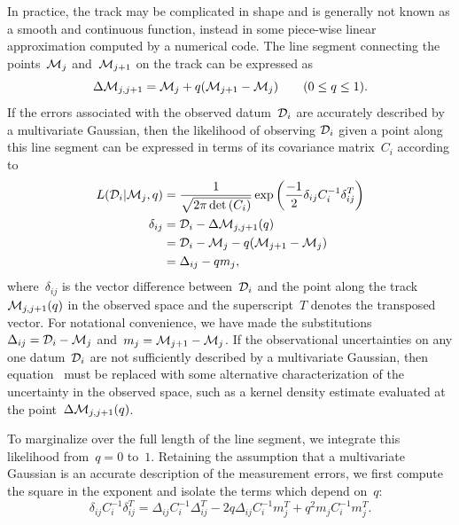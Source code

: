 \documentclass[ms.tex]{subfiles}
\begin{document}
In practice, the track may be complicated in shape and is generally not known
as a smooth and continuous function, instead in some piece-wise linear
approximation computed by a numerical code.
The line segment connecting the points~$\mathcal{M}_j$ and~$\mathcal{M}_{j + 1}$
on the track can be expressed as
\begin{equation}
\Delta\mathcal{M}_{j,j + 1} = \mathcal{M}_j + q(\mathcal{M}_{j + 1} -
\mathcal{M}_j) \qquad (0 \leq q \leq 1).
\end{equation}
If the errors associated with the observed datum~$\mathcal{D}_i$ are accurately
described by a multivariate Gaussian, then the likelihood of observing
$\mathcal{D}_i$ given a point along this line segment can be expressed in terms
of its covariance matrix~$C_i$ according to
\begin{subequations}\begin{align}
L(\mathcal{D}_i | \mathcal{M}_j, q) &=
\frac{1}{\sqrt{2\pi \det{(C_i)}}}
\exp\left(\frac{-1}{2} \delta_{ij} C_i^{-1} \delta_{ij}^T\right)
\label{eq:l_di_mj_q}
\\
\delta_{ij} &= \mathcal{D}_i - \Delta \mathcal{M}_{j,j + 1}(q)
\\
&= \mathcal{D}_i - \mathcal{M}_j - q(\mathcal{M}_{j + 1} - \mathcal{M}_j)
\\
&= \Delta_{ij} - qm_j,
\label{eq:delta_minus_qmj}
\end{align}\end{subequations}
where~$\delta_{ij}$ is the vector difference between~$\mathcal{D}_i$ and the
point along the track~$\mathcal{M}_{j,j + 1}(q)$ in the observed space and the
superscript~$T$ denotes the transposed vector.
For notational convenience, we have made the substitutions
$\Delta_{ij} = \mathcal{D}_i - \mathcal{M}_j$ and~$m_j = \mathcal{M}_{j + 1} -
\mathcal{M}_j$.
If the observational uncertainties on any one datum~$\mathcal{D}_i$ are not
sufficiently described by a multivariate Gaussian, then
equation~ must be replaced with some alternative
characterization of the uncertainty in the observed space, such as a kernel
density estimate evaluated at the point~$\Delta\mathcal{M}_{j,j + 1}(q)$.
\par
To marginalize over the full length of the line segment, we integrate this
likelihood from~$q = 0$ to~$1$.
Retaining the assumption that a multivariate Gaussian is an accurate
description of the measurement errors, we first compute the square in the
exponent and isolate the terms which depend on~$q$:
\begin{equation}
\delta_{ij} C_i^{-1} \delta_{ij}^T = \Delta_{ij} C_i^{-1} \Delta_{ij}^T -
2q\Delta_{ij}C_i^{-1}m_j^T + q^2m_jC_i^{-1}m_j^T.
\label{eq:chisquared}
\end{equation}
\end{document}
